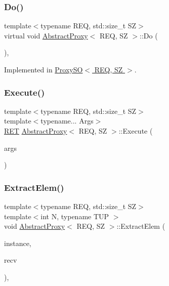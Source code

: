 \subsubsection{\texorpdfstring{Do()}{Do()}}
{\footnotesize\ttfamily template$<$typename R\+EQ, std\+::size\+\_\+t SZ$>$ \\
virtual void \hyperlink{classAbstractProxy}{Abstract\+Proxy}$<$ R\+EQ, SZ $>$\+::Do (\begin{DoxyParamCaption}\item[{R\+EQ \&}]{ }\end{DoxyParamCaption})\hspace{0.3cm}{\ttfamily [protected]}, {}}



Implemented in \hyperlink{classProxySO_aea9532d196e05f80b2dd0de425df711f}{Proxy\+S\+O$<$ R\+E\+Q, S\+Z $>$}.

\mbox{\label{classAbstractProxy_ad1aecd99b6f9da7cbe0c2977f4462040}} 
\subsubsection{\texorpdfstring{Execute()}{Execute()}}
{\footnotesize\ttfamily template$<$typename R\+EQ, std\+::size\+\_\+t SZ$>$ \\
template$<$typename... Args$>$ \\
\hyperlink{classAbstractProxy_ab2af611a27c14916a27d0e9249f0291b}{R\+ET} \hyperlink{classAbstractProxy}{Abstract\+Proxy}$<$ R\+EQ, SZ $>$\+::Execute (\begin{DoxyParamCaption}\item[{Args...}]{args }\end{DoxyParamCaption})\hspace{0.3cm}{\ttfamily [inline]}}

\mbox{\label{classAbstractProxy_a71a17de97da68a12f3cc7d23995478e2}} 
\subsubsection{\texorpdfstring{Extract\+Elem()}{ExtractElem()}}
{\footnotesize\ttfamily template$<$typename R\+EQ, std\+::size\+\_\+t SZ$>$ \\
template$<$int N, typename T\+UP $>$ \\
void \hyperlink{classAbstractProxy}{Abstract\+Proxy}$<$ R\+EQ, SZ $>$\+::Extract\+Elem (\begin{DoxyParamCaption}\item[{T\+UP \&}]{instance,  }\item[{void $\ast$\&}]{recv }\end{DoxyParamCaption})\hspace{0.3cm}{\ttfamily [inline]}, {\ttfamily [protected]}}

